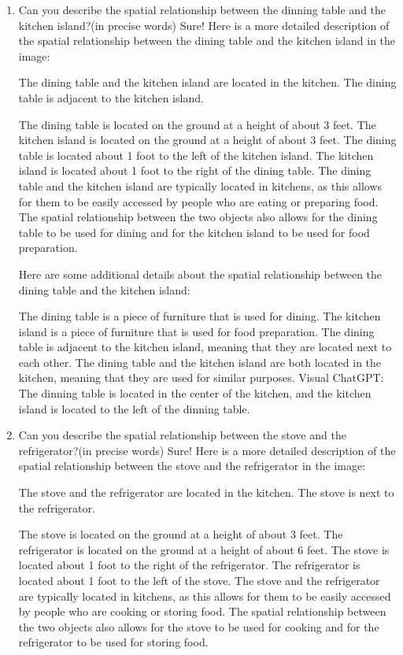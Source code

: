 \begin{enumerate}
    \item Can you describe the spatial relationship between the dinning table and the kitchen island?(in precise words)
    \subitem Sure! Here is a more detailed description of the spatial relationship between the dining table and the kitchen island in the image:

    The dining table and the kitchen island are located in the kitchen. The dining table is adjacent to the kitchen island.
    
    The dining table is located on the ground at a height of about 3 feet.
    The kitchen island is located on the ground at a height of about 3 feet.
    The dining table is located about 1 foot to the left of the kitchen island.
    The kitchen island is located about 1 foot to the right of the dining table.
    The dining table and the kitchen island are typically located in kitchens, as this allows for them to be easily accessed by people who are eating or preparing food. The spatial relationship between the two objects also allows for the dining table to be used for dining and for the kitchen island to be used for food preparation.
    
    Here are some additional details about the spatial relationship between the dining table and the kitchen island:
    
    The dining table is a piece of furniture that is used for dining.
    The kitchen island is a piece of furniture that is used for food preparation.
    The dining table is adjacent to the kitchen island, meaning that they are located next to each other.
    The dining table and the kitchen island are both located in the kitchen, meaning that they are used for similar purposes.
    \subitem Visual ChatGPT: The dinning table is located in the center of the kitchen, and the kitchen island is located to the left of the dinning table.
    \item Can you describe the spatial relationship between the stove and the refrigerator?(in precise words)
    \subitem Sure! Here is a more detailed description of the spatial relationship between the stove and the refrigerator in the image:

    The stove and the refrigerator are located in the kitchen. The stove is next to the refrigerator.
    
    The stove is located on the ground at a height of about 3 feet.
    The refrigerator is located on the ground at a height of about 6 feet.
    The stove is located about 1 foot to the right of the refrigerator.
    The refrigerator is located about 1 foot to the left of the stove.
    The stove and the refrigerator are typically located in kitchens, as this allows for them to be easily accessed by people who are cooking or storing food. The spatial relationship between the two objects also allows for the stove to be used for cooking and for the refrigerator to be used for storing food.
    

\end{enumerate}
